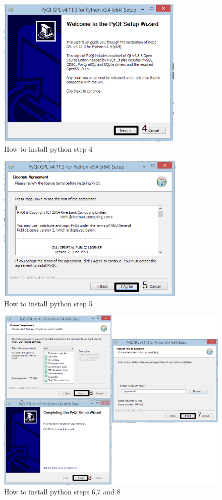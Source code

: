 \begin{enumerate}
\begin{figure}[H]
	\includegraphics{./manual/images/pyqt-installation-instructions-3.png}
	\caption{How to install python step 4}
\end{figure}

\begin{figure}[H]
	\includegraphics{./manual/images/pyqt-installation-instructions-4.png}
	\caption{How to install python step 5}
\end{figure}

\begin{figure}[H]
	\includegraphics{./manual/images/pyqt-installation-instructions-5.png}
	\caption{How to install python steps 6,7 and 8}
\end{figure}
\end{enumerate}

